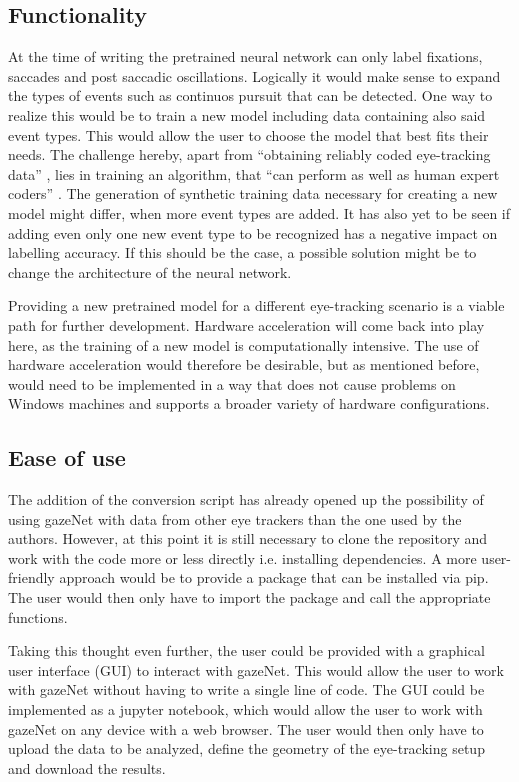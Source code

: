 \documentclass[conference]{IEEEtran}
\begin{document}
\subsection{Functionality}
At the time of writing the pretrained neural network can only label fixations, saccades and post saccadic oscillations. Logically it would make sense to expand the types of events such as continuos pursuit that can be detected. One way to realize this would be to train a new model including data containing also said event types. This would allow the user to choose the model that best fits their needs. The challenge hereby, apart from ``obtaining reliably coded eye-tracking data'' \cite{zemblys2018gazeNet}, lies in training an algorithm, that ``can perform as well as human expert coders'' \cite{zemblys2018gazeNet}. The generation of synthetic training data necessary for creating a new model might differ, when more event types are added. It has also yet to be seen if adding even only one new event type to be recognized has a negative impact on labelling accuracy. If this should be the case, a possible solution might be to change the architecture of the neural network.

Providing a new pretrained model for a different eye-tracking scenario is a viable path for further development. Hardware acceleration will come back into play here, as the training of a new model is computationally intensive. The use of hardware acceleration would therefore be desirable, but as mentioned before, would need to be implemented in a way that does not cause problems on Windows machines and supports a broader variety of hardware configurations.


\subsection{Ease of use}
The addition of the conversion script has already opened up the possibility of using gazeNet with data from other eye trackers than the one used by the authors. However, at this point it is still necessary to clone the repository and work with the code more or less directly i.e. installing dependencies. A more user-friendly approach would be to provide a package that can be installed via pip. The user would then only have to import the package and call the appropriate functions.

Taking this thought even further, the user could be provided with a graphical user interface (GUI) to interact with gazeNet. This would allow the user to work with gazeNet without having to write a single line of code. The GUI could be implemented as a jupyter notebook, which would allow the user to work with gazeNet on any device with a web browser. The user would then only have to upload the data to be analyzed, define the geometry of the eye-tracking setup and download the results.
\end{document}
